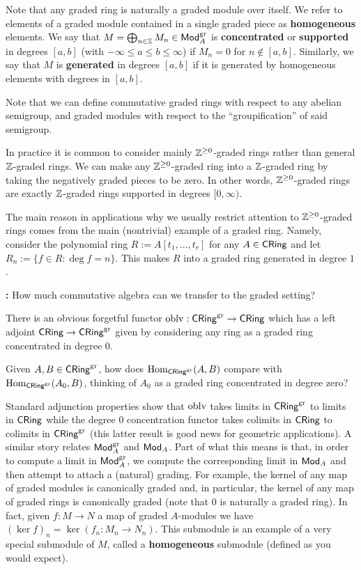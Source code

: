 \documentclass[11pt]{article}
\begin{document}
Note that any graded ring is naturally a graded module over itself. We refer to elements of a graded module contained in a single graded piece as \textbf{homogeneous} elements. We say that $M=\bigoplus_{n\in\mathbb{Z}}M_n\in\operatorname{\mathsf{Mod}}_A^{\operatorname{gr}}$ is \textbf{concentrated} or \textbf{supported} in degrees $[a,b]$ (with $-\infty\leq a\leq b\leq\infty$) if $M_n=0$ for $n\not\in[a,b]$. Similarly, we say that $M$ is \textbf{generated} in degrees $[a,b]$ if it is generated by homogeneous elements with degrees in $[a,b]$.

\begin{remark}
Note that we can define commutative graded rings with respect to any abelian semigroup, and graded modules with respect to the ``groupification'' of said semigroup.
\end{remark}

In practice it is common to consider mainly $\mathbb{Z}^{\geq0}$-graded rings rather than general $\mathbb{Z}$-graded rings. We can make any $\mathbb{Z}^{\geq0}$-graded ring into a $\mathbb{Z}$-graded ring by taking the negatively graded pieces to be zero. In other words, $\mathbb{Z}^{\geq0}$-graded rings are exactly $\mathbb{Z}$-graded rings supported in degrees $[0,\infty)$.

\begin{example}
The main reason in applications why we usually restrict attention to $\mathbb{Z}^{\geq0}$-graded rings comes from the main (nontrivial) example of a graded ring. Namely, consider the polynomial ring $R:=A[t_1,\ldots,t_r]$ for any $A\in\operatorname{\mathsf{CRing}}$ and let $R_n:=\{f\in R : \deg f=n\}$. This makes $R$ into a graded ring generated in degree $1$.
\end{example}

\textbf{:} How much commutative algebra can we transfer to the graded setting?

There is an obvious forgetful functor $\operatorname{oblv}: \operatorname{\mathsf{CRing}}^{\operatorname{gr}}\to\operatorname{\mathsf{CRing}}$ which has a left adjoint $\operatorname{\mathsf{CRing}}\to\operatorname{\mathsf{CRing}}^{\operatorname{gr}}$ given by considering any ring as a graded ring concentrated in degree $0$. 

\begin{exercise}
Given $A,B\in\operatorname{\mathsf{CRing}}^{\operatorname{gr}}$, how does $\operatorname{Hom}_{\operatorname{\mathsf{CRing}}^{\operatorname{gr}}}(A,B)$ compare with $\operatorname{Hom}_{\operatorname{\mathsf{CRing}}^{\operatorname{gr}}}(A_0,B)$, thinking of $A_0$ as a graded ring concentrated in degree zero?
\end{exercise}

Standard adjunction properties show that $\operatorname{oblv}$ takes limits in $\operatorname{\mathsf{CRing}}^{\operatorname{gr}}$ to limits in $\operatorname{\mathsf{CRing}}$ while the degree $0$ concentration functor takes colimits in $\operatorname{\mathsf{CRing}}$ to colimits in $\operatorname{\mathsf{CRing}}^{\operatorname{gr}}$ (this latter result is good news for geometric applications). A similar story relates $\operatorname{\mathsf{Mod}}_A^{\operatorname{gr}}$ and $\operatorname{\mathsf{Mod}}_A$. Part of what this means is that, in order to compute a limit in $\operatorname{\mathsf{Mod}}_A^{\operatorname{gr}}$, we compute the corresponding limit in $\operatorname{\mathsf{Mod}}_A$ and then attempt to attach a (natural) grading. For example, the kernel of any map of graded modules is canonically graded and, in particular, the kernel of any map of graded rings is canonically graded (note that $0$ is naturally a graded ring). In fact, given $f: M\to N$ a map of graded $A$-modules we have $(\ker f)_n=\ker(f_n: M_n\to N_n)$. This submodule is an example of a very special submodule of $M$, called a \textbf{homogeneous} submodule (defined as you would expect).
\end{document}
